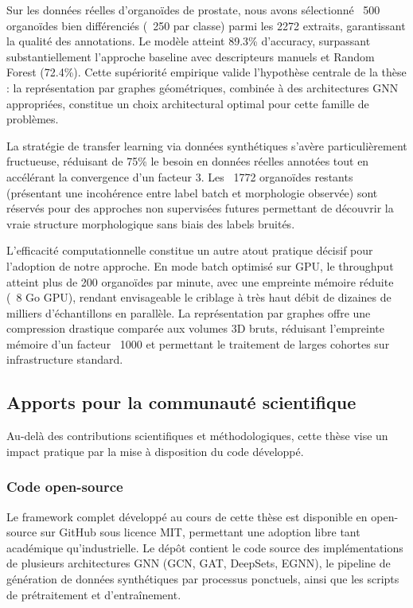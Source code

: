 Sur les données réelles d'organoïdes de prostate, nous avons sélectionné ~500 organoïdes bien différenciés (~250 par classe) parmi les 2272 extraits, garantissant la qualité des annotations. Le modèle atteint 89.3\% d'accuracy, surpassant substantiellement l'approche baseline avec descripteurs manuels et Random Forest (72.4\%). Cette supériorité empirique valide l'hypothèse centrale de la thèse : la représentation par graphes géométriques, combinée à des architectures GNN appropriées, constitue un choix architectural optimal pour cette famille de problèmes.

La stratégie de transfer learning via données synthétiques s'avère particulièrement fructueuse, réduisant de 75\% le besoin en données réelles annotées tout en accélérant la convergence d'un facteur 3. Les ~1772 organoïdes restants (présentant une incohérence entre label batch et morphologie observée) sont réservés pour des approches non supervisées futures permettant de découvrir la vraie structure morphologique sans biais des labels bruités.

L'efficacité computationnelle constitue un autre atout pratique décisif pour l'adoption de notre approche. En mode batch optimisé sur GPU, le throughput atteint plus de 200 organoïdes par minute, avec une empreinte mémoire réduite (~8 Go GPU), rendant envisageable le criblage à très haut débit de dizaines de milliers d'échantillons en parallèle. La représentation par graphes offre une compression drastique comparée aux volumes 3D bruts, réduisant l'empreinte mémoire d'un facteur ~1000 et permettant le traitement de larges cohortes sur infrastructure standard.


\subsection{Apports pour la communauté scientifique}

Au-delà des contributions scientifiques et méthodologiques, cette thèse vise un impact pratique par la mise à disposition du code développé.

\subsubsection{Code open-source}

Le framework complet développé au cours de cette thèse est disponible en open-source sur GitHub sous licence MIT, permettant une adoption libre tant académique qu'industrielle. Le dépôt contient le code source des implémentations de plusieurs architectures GNN (GCN, GAT, DeepSets, EGNN), le pipeline de génération de données synthétiques par processus ponctuels, ainsi que les scripts de prétraitement et d'entraînement.

